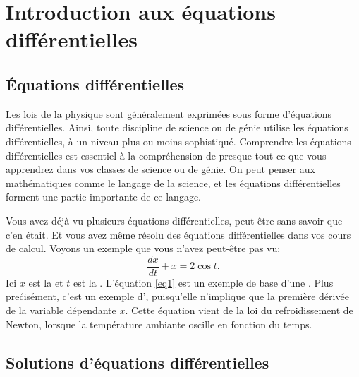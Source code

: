 
\sectionnewpage
\section{Introduction aux \'equations diff\'erentielles}
\label{introde:section}


\subsection{\'Equations diff\'erentielles}

Les lois de la physique sont g\'en\'eralement exprim\'ees sous forme d'\'equations diff\'erentielles.  Ainsi, toute discipline de science ou de g\'enie utilise les \'equations diff\'erentielles, \`a un niveau plus ou moins sophistiqu\'e.  Comprendre les \'equations diff\'erentielles est essentiel \`a la compr\'ehension de presque tout ce que vous apprendrez dans vos classes de science ou de g\'enie.  On peut penser aux math\'ematiques comme le langage de la science, et les \'equations diff\'erentielles forment une partie importante de ce langage.

Vous avez d\'ej\`a vu plusieurs \'equations diff\'erentielles, peut-\^etre sans savoir que c'en \'etait.
Et vous avez m\^eme r\'esolu des \'equations diff\'erentielles dans vos cours de calcul.  Voyons un exemple que vous n'avez peut-\^etre pas vu:
\begin{equation} \label{eq1}
\frac{dx}{dt} + x = 2 \cos t .
\end{equation}
Ici $x$ est la  \emph{} et $t$ est la \emph{}.
L'équation \eqref{eq1}
est un exemple de base d'une \emph{}. Plus pre\'cis\'ement, c'est un exemple d'\emph{}, puisqu'elle n'implique que la premi\`ere d\'eriv\'ee de la variable d\'ependante $x$.  Cette \'equation vient de la loi du refroidissement de Newton, lorsque la temp\'erature ambiante oscille en fonction du temps.

\subsection{Solutions d'\'equations diff\'erentielles}

